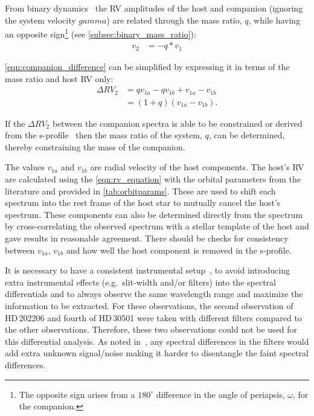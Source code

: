 From binary dynamics~\citep[e.g.][]{murray_keplerian_2010} the {RV} amplitudes of the host and companion (ignoring the system velocity $gamma$) are related through the mass ratio, \(q\), while having an opposite sign\footnote{The opposite sign arises from a \(180^\circ\) difference in the angle of periapsis, \(\omega\), for the companion.} (see \cref{subsec:binary_mass_ratio}):
\begin{align}
v_{2} &= -q * v_{1} \label{eqn:q_relation}
\end{align}

\cref{eqn:companion_difference} can be simplified by expressing it in terms of the mass ratio and host {RV} only:
\begin{align}
\Delta {RV}_{2} &= q v_{1a} - q v_{1b} + v_{1a} - v_{1b} \nonumber \\
&= (1 + q)(v_{1a} - v_{1b}).\label{eqn:companion_difference_simplified}
\end{align}

If the \(\Delta {RV}_2\) between the companion spectra is able to be constrained or derived from the s-profile~\citep[see][]{ferluga_separating_1997} then the mass ratio of the system, \(q\), can be determined, thereby constraining the mass of the companion.

The values \(v_{1a}\) and \(v_{1b}\) are radial velocity of the host components.
The host's {RV} are calculated using the \cref{eqn:rv_equation} with the orbital parameters from the literature and provided in \cref{tab:orbitparams}.
These are used to shift each spectrum into the rest frame of the host star to mutually cancel the host's spectrum.
These components can also be determined directly from the spectrum by cross-correlating the observed spectrum with a stellar template of the host and gave results in reasonable agreement.
There should be checks for consistency between \(v_{1a}\), \(v_{1b}\) and how well the host component is removed in the s-profile.

It is necessary to have a consistent instrumental setup~\citep{ferluga_separating_1997,hadrava_disentangling_2009}, to avoid introducing extra instrumental effects (e.g.\ slit-width and/or filters) into the spectral differentials and to always observe the same wavelength range and maximize the information to be extracted.
For these observations, the second observation of {HD\,202206} and fourth of {HD\,30501} were taken with different filters compared to the other observations.
Therefore, these two observations could not be used for this differential analysis.
As noted in~\citet{hadrava_disentangling_2009}, any spectral differences in the filters would add extra unknown signal/noise making it harder to disentangle the faint spectral differences.

